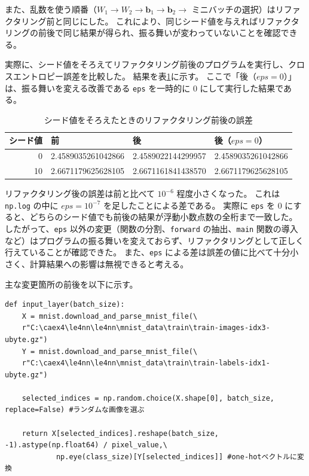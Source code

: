 \documentclass[a4paper,11pt]{ltjsarticle}
\begin{document}
また、乱数を使う順番（$W_1 \to W_2 \to \bm{b}_1 \to \bm{b}_2 \to$ ミニバッチの選択）はリファクタリング前と同じにした。
これにより、同じシード値を与えればリファクタリングの前後で同じ結果が得られ、振る舞いが変わっていないことを確認できる。

実際に、シード値をそろえてリファクタリング前後のプログラムを実行し、クロスエントロピー誤差を比較した。
結果を表\ref{tab:seedcmp}に示す。
ここで「後（$\mathit{eps}=0$）」は、振る舞いを変える改善である \texttt{eps} を一時的に 0 にして実行した結果である。

\begin{table}[H]
  \centering
  \caption{シード値をそろえたときのリファクタリング前後の誤差}
  \label{tab:seedcmp}
  \small
  \begin{tabular}{rlll}
    \toprule
    シード値 & 前 & 後 & 後（$\mathit{eps}=0$） \\
    \midrule
    0  & 2.4589035261042866 & 2.4589022144299957 & 2.4589035261042866 \\
    10 & 2.6671179625628105 & 2.6671161841438570 & 2.6671179625628105 \\
    \bottomrule
  \end{tabular}
\end{table}

リファクタリング後の誤差は前と比べて $10^{-6}$ 程度小さくなった。
これは \texttt{np.log} の中に $\mathit{eps}=10^{-7}$ を足したことによる差である。
実際に \texttt{eps} を 0 にすると、どちらのシード値でも前後の結果が浮動小数点数の全桁まで一致した。
したがって、\texttt{eps} 以外の変更（関数の分割、\texttt{forward} の抽出、\texttt{main} 関数の導入など）はプログラムの振る舞いを変えておらず、リファクタリングとして正しく行えていることが確認できた。
また、\texttt{eps} による差は誤差の値に比べて十分小さく、計算結果への影響は無視できると考える。

主な変更箇所の前後を以下に示す。

\begin{lstlisting}[style=before, caption={【前】データの読み込みとミニバッチの選択が1つの関数に混在}, label=lst:k2b1]
def input_layer(batch_size):
    X = mnist.download_and_parse_mnist_file(\
    r"C:\caex4\le4nn\le4nn\mnist_data\train\train-images-idx3-ubyte.gz")
    Y = mnist.download_and_parse_mnist_file(\
    r"C:\caex4\le4nn\le4nn\mnist_data\train\train-labels-idx1-ubyte.gz")

    selected_indices = np.random.choice(X.shape[0], batch_size, replace=False) #ランダムな画像を選ぶ

    return X[selected_indices].reshape(batch_size, -1).astype(np.float64) / pixel_value,\
            np.eye(class_size)[Y[selected_indices]] #one-hotベクトルに変換
\end{lstlisting}
\end{document}
